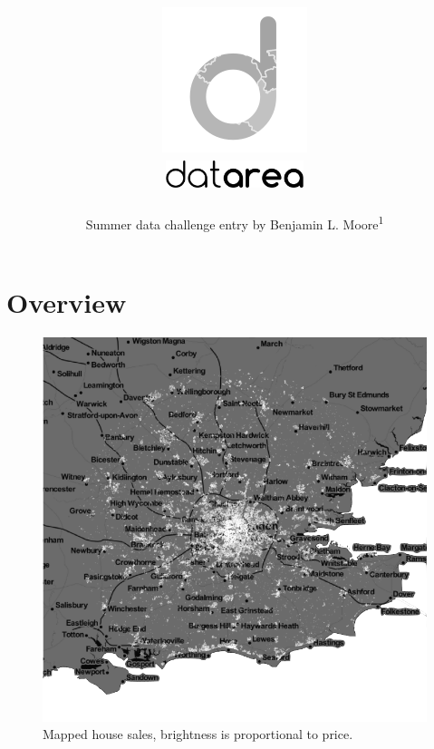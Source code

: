 \documentclass[
10pt, %
a4paper, %
oneside, %
headinclude,footinclude, %
BCOR5mm, %
]{scrartcl}
\title{ \vspace{-3em}
\includegraphics[width=.1\textwidth]{Figures/logo.png} \\
\includegraphics[width=4cm]{Figures/logotext.png} \\
} %
\author{  Summer data challenge entry by Benjamin
  L. Moore\textsuperscript{1} } %
\date{} %
\begin{document}

\renewcommand{\sectionmark}[1]{\markright{\spacedlowsmallcaps{summerdatachallenge}}} %
\lehead{\mbox{\llap{\small\thepage\kern1em\color{halfgray} \vline}\color{halfgray}\hspace{0.5em}\rightmark\hfil}} %

\pagestyle{scrheadings} %


\maketitle %

\setcounter{tocdepth}{2} %




\vspace{-4em}
\section*{Overview} 

\setlength{\intextsep}{0em}
\begin{figure}
\centering
\includegraphics[width=.28\textwidth]{Figures/overview.png}
\caption{ Mapped house sales, brightness is proportional to price.}
\end{figure}
\end{document}
